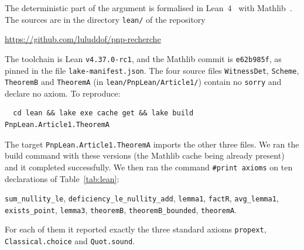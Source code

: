 \documentclass[11pt,a4paper]{article}
\theoremstyle{definition}
\theoremstyle{remark}
\begin{document}
The deterministic part of the argument is formalised in Lean~4~\cite{Lean4} with
Mathlib~\cite{Mathlib}. The sources are in the directory \texttt{lean/} of the repository
\begin{center}
\url{https://github.com/luluddof/pnp-recherche}
\end{center}
The toolchain is Lean \texttt{v4.37.0-rc1}, and the Mathlib commit is \texttt{e62b985f}, as
pinned in the file \texttt{lake-manifest.json}. The four source files \texttt{WitnessDet},
\texttt{Scheme}, \texttt{TheoremB} and \texttt{TheoremA} (in \texttt{lean/PnpLean/Article1/}) contain
no \texttt{sorry} and declare no axiom. To reproduce:
\begin{verbatim}
  cd lean && lake exe cache get && lake build PnpLean.Article1.TheoremA
\end{verbatim}
The target \texttt{PnpLean.Article1.TheoremA} imports the other three files. We ran the build
command with these versions (the Mathlib cache being already present) and it completed
successfully. We then ran the command \texttt{\#print axioms} on ten declarations of
Table~\ref{tab:lean}:
\begin{center}
\texttt{sum\_nullity\_le}, \texttt{deficiency\_le\_nullity\_add}, \texttt{lemma1},
\texttt{factR}, \texttt{avg\_lemma1},\\ \texttt{exists\_point}, \texttt{lemma3},
\texttt{theoremB}, \texttt{theoremB\_bounded}, \texttt{theoremA}.
\end{center}
For each of them it reported exactly the three standard axioms \texttt{propext},
\texttt{Classical.choice} and \texttt{Quot.sound}.
\end{document}
